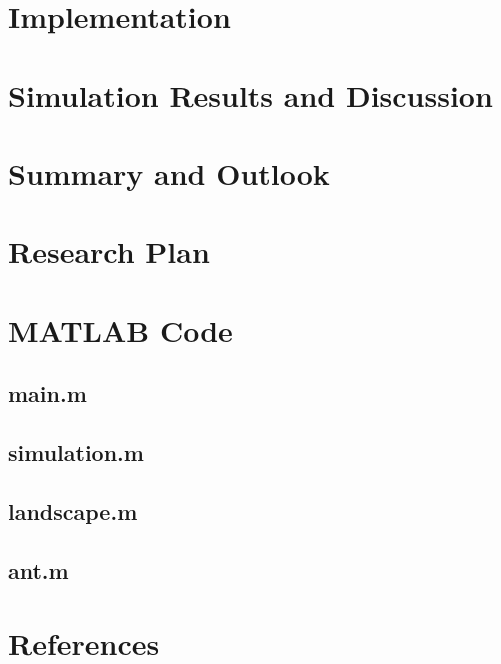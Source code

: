 \documentclass[11pt]{article}
\begin{document}
\section{Implementation}

\section{Simulation Results and Discussion}

\section{Summary and Outlook}

\appendix

\section{Research Plan}

\section{MATLAB Code}
\subsection{main.m}

\subsection{simulation.m}

\subsection{landscape.m}

\subsection{ant.m}


\section{References}



\end{document}
